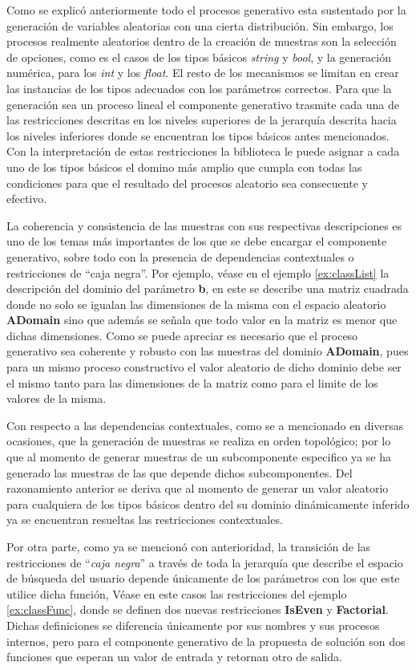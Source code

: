 Como se explicó anteriormente todo el procesos generativo esta sustentado por la generación de variables aleatorias
con una cierta distribución. Sin embargo, los procesos realmente aleatorios dentro de la creación de muestras son la
selección de opciones, como es el casos de los tipos básicos {\it string} y {\it bool}, y la generación numérica, para los {\it int} y los
{\it float}. El resto de los mecanismos se limitan en crear las instancias de los tipos adecuados con los parámetros correctos. Para que
la generación sea un proceso lineal el componente generativo trasmite cada una de las restricciones descritas en los niveles
superiores de la jerarquía descrita hacia los niveles inferiores donde se encuentran los tipos básicos antes mencionados.
Con la interpretación de estas restricciones la biblioteca le puede asignar a cada uno de los tipos básicos el domino más
amplio que cumpla con todas las condiciones para que el resultado del procesos aleatorio sea consecuente y efectivo.

La coherencia y consistencia de las muestras con sus respectivas descripciones es uno de los temas más importantes de los que
se debe encargar el componente generativo, sobre todo con la presencia de dependencias contextuales o restricciones de
``caja negra''. Por ejemplo, véase en el ejemplo \ref{ex:classList} la descripción del dominio del parámetro {\bf b}, en este se describe una matriz cuadrada
donde no solo se igualan las dimensiones de la misma con el espacio aleatorio {\bf ADomain} sino que además se señala que todo
valor en la matriz es menor que dichas dimensiones. Como se puede apreciar es necesario que el proceso generativo sea coherente
y robusto con las muestras del dominio {\bf ADomain}, pues para un mismo proceso constructivo el valor aleatorio de dicho dominio
debe ser el mismo tanto para las dimensiones de la matriz como para el limite de los valores de la misma.

Con respecto a las dependencias contextuales, como se a mencionado en diversas ocasiones, que la generación de muestras se realiza
en orden topológico; por lo que al momento de generar muestras de un subcomponente especifico ya se ha
generado las muestras de las que depende dichos subcomponentes. Del razonamiento anterior se deriva que al momento de generar
un valor aleatorio para cualquiera de los tipos básicos dentro del su dominio dinámicamente inferido ya se encuentran resueltas
las restricciones contextuales.

Por otra parte, como ya se mencionó con anterioridad, la transición de las restricciones de “{\it caja negra}” a través de
toda la jerarquía que describe el espacio de búsqueda del usuario depende únicamente de los parámetros con los que
este utilice dicha función, Véase en este casos las restricciones del ejemplo \ref{ex:classFunc}, donde se definen dos nuevas
restricciones {\bf IsEven} y {\bf Factorial}. Dichas definiciones se diferencia únicamente por sus nombres y sus procesos internos,
pero para el componente generativo de la propuesta de solución son dos funciones que esperan un valor de entrada y
retornan otro de salida.

